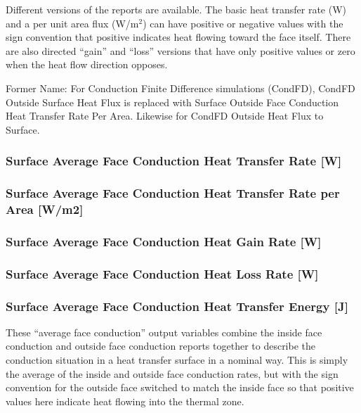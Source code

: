 Different versions of the reports are available. The basic heat transfer rate (W) and a per unit area flux (W/m\(^{2}\)) can have positive or negative values with the sign convention that positive indicates heat flowing toward the face itself. There are also directed ``gain'' and ``loss'' versions that have only positive values or zero when the heat flow direction opposes.

Former Name: For Conduction Finite Difference simulations (CondFD), CondFD Outside Surface Heat Flux is replaced with Surface Outside Face Conduction Heat Transfer Rate Per Area. Likewise for CondFD Outside Heat Flux to Surface.

\subsubsection{Surface Average Face Conduction Heat Transfer Rate {[}W{]}}\label{surface-average-face-conduction-heat-transfer-rate-w}

\subsubsection{Surface Average Face Conduction Heat Transfer Rate per Area {[}W/m2{]}}\label{surface-average-face-conduction-heat-transfer-rate-per-area-wm2}

\subsubsection{Surface Average Face Conduction Heat Gain Rate {[}W{]}}\label{surface-average-face-conduction-heat-gain-rate-w}

\subsubsection{Surface Average Face Conduction Heat Loss Rate {[}W{]}}\label{surface-average-face-conduction-heat-loss-rate-w}

\subsubsection{Surface Average Face Conduction Heat Transfer Energy {[}J{]}}\label{surface-average-face-conduction-heat-transfer-energy-j}

These ``average face conduction'' output variables combine the inside face conduction and outside face conduction reports together to describe the conduction situation in a heat transfer surface in a nominal way. This is simply the average of the inside and outside face conduction rates, but with the sign convention for the outside face switched to match the inside face so that positive values here indicate heat flowing into the thermal zone.

